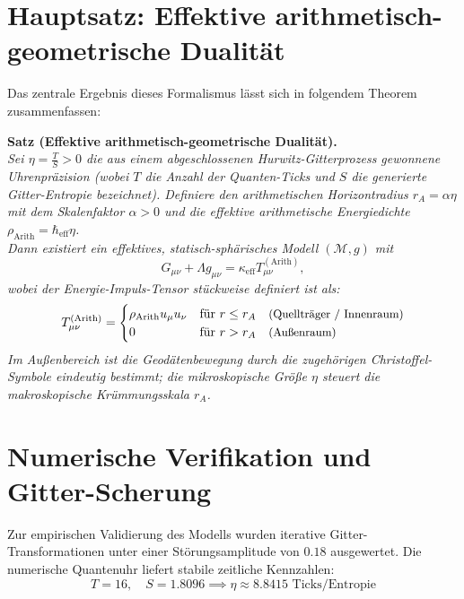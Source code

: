 \documentclass[11pt,a4paper,nofootinbib]{article}
\begin{document}
	\section{Hauptsatz: Effektive arithmetisch-geometrische Dualität}
	Das zentrale Ergebnis dieses Formalismus lässt sich in folgendem Theorem zusammenfassen:
	
	\medskip
	\noindent\textbf{Satz (Effektive arithmetisch-geometrische Dualität).}\\
	\textit{Sei $\eta = \frac{T}{S} > 0$ die aus einem abgeschlossenen Hurwitz-Gitterprozess gewonnene Uhrenpräzision (wobei $T$ die Anzahl der Quanten-Ticks und $S$ die generierte Gitter-Entropie bezeichnet). Definiere den arithmetischen Horizontradius $r_A = \alpha \eta$ mit dem Skalenfaktor $\alpha > 0$ und die effektive arithmetische Energiedichte $\rho_{\text{Arith}} = \hbar_{\text{eff}} \eta$.\\
		Dann existiert ein effektives, statisch-sphärisches Modell $(\mathcal{M}, g)$ mit
		\begin{equation}
			G_{\mu\nu} + \Lambda g_{\mu\nu} = \kappa_{\text{eff}} T_{\mu\nu}^{(\text{Arith})},
		\end{equation}
		wobei der Energie-Impuls-Tensor stückweise definiert ist als:
		\begin{equation}
			T_{\mu\nu}^{(\text{Arith})} = \begin{cases} 
				\rho_{\text{Arith}} u_\mu u_\nu & \text{für } r \le r_A \quad \text{\small(Quellträger / Innenraum)} \\ 
				0 & \text{für } r > r_A \quad \text{\small(Außenraum)} 
			\end{cases}
		\end{equation}
		Im Außenbereich ist die Geodätenbewegung durch die zugehörigen Christoffel-Symbole eindeutig bestimmt; die mikroskopische Größe $\eta$ steuert die makroskopische Krümmungsskala $r_A$.}\\
	\medskip
	
	\section{Numerische Verifikation und Gitter-Scherung}
	Zur empirischen Validierung des Modells wurden iterative Gitter-Transformationen unter einer Störungsamplitude von $0.18$ ausgewertet. Die numerische Quantenuhr liefert stabile zeitliche Kennzahlen:
	\begin{equation}
		T = 16, \quad S = 1.8096 \implies \eta \approx 8.8415 \text{ Ticks/Entropie}
	\end{equation}
	
\end{document}
